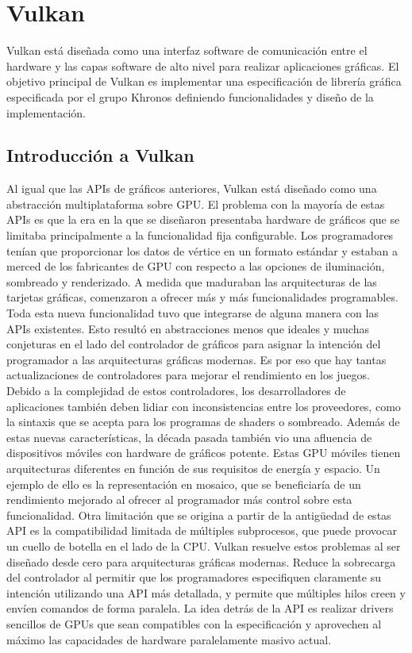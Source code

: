 \documentclass[a4paper, 17pt]{book}
\begin{document}
\section{Vulkan} 
\label{sec:Vulkan}

Vulkan está diseñada como una interfaz software de comunicación entre el hardware y las capas software de alto nivel para
realizar aplicaciones gráficas. El objetivo principal de Vulkan es implementar una especificación de librería gráfica
especificada por el grupo Khronos definiendo funcionalidades y diseño de la implementación.

\subsection{Introducción a Vulkan} 
\label{subsec:IntroVulkan}

Al igual que las APIs de gráficos anteriores, Vulkan está diseñado como una abstracción multiplataforma sobre GPU.
El problema con la mayoría de estas APIs es que la era en la que se diseñaron presentaba hardware de gráficos que se
limitaba principalmente a la funcionalidad fija configurable. Los programadores tenían que proporcionar los datos de
vértice en un formato estándar y estaban a merced de los fabricantes de GPU con respecto a las opciones de iluminación,
sombreado y renderizado.
\bigbreak
A medida que maduraban las arquitecturas de las tarjetas gráficas, comenzaron a ofrecer más y más funcionalidades
programables. Toda esta nueva funcionalidad tuvo que integrarse de alguna manera con las APIs existentes. Esto resultó
en abstracciones menos que ideales y muchas conjeturas en el lado del controlador de gráficos para asignar la intención
del programador a las arquitecturas gráficas modernas. Es por eso que hay tantas actualizaciones de controladores para
mejorar el rendimiento en los juegos. Debido a la complejidad de estos controladores, los desarrolladores de aplicaciones
también deben lidiar con inconsistencias entre los proveedores, como la sintaxis que se acepta para los programas de
shaders o sombreado. 
\bigbreak
Además de estas nuevas características, la década pasada también vio una afluencia de dispositivos móviles con hardware
de gráficos potente. Estas GPU móviles tienen arquitecturas diferentes en función de sus requisitos de energía y espacio.
Un ejemplo de ello es la representación en mosaico, que se beneficiaría de un rendimiento mejorado al ofrecer al
programador más control sobre esta funcionalidad. Otra limitación que se origina a partir de la antigüedad de estas API
es la compatibilidad limitada de múltiples subprocesos, que puede provocar un cuello de botella en el lado de la CPU.
\bigbreak
Vulkan resuelve estos problemas al ser diseñado desde cero para arquitecturas gráficas modernas. Reduce la sobrecarga
del controlador al permitir que los programadores especifiquen claramente su intención utilizando una API más detallada,
y permite que múltiples hilos creen y envíen comandos de forma paralela. La idea detrás de la API es realizar drivers
sencillos de GPUs que sean compatibles con la especificación y aprovechen al máximo las capacidades de hardware paralelamente
masivo actual.
\end{document}
